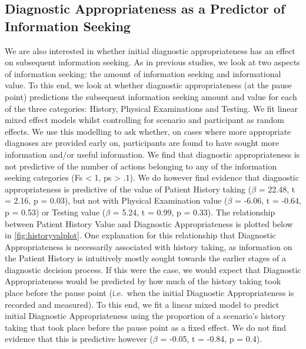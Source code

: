 \documentclass[a4paper, nobind]{templates/ociamthesis}
\begin{document}
\subsection{Diagnostic Appropriateness as a Predictor of Information Seeking}\label{diagnostic-appropriateness-as-a-predictor-of-information-seeking}

\hfill\break
We are also interested in whether initial diagnostic appropriateness has an effect on subsequent information seeking. As in previous studies, we look at two aspects of information seeking: the amount of information seeking and informational value. To this end, we look at whether diagnostic appropriateness (at the pause point) predictions the subsequent information seeking amount and value for each of the three categories: History, Physical Examinations and Testing. We fit linear mixed effect models whilst controlling for scenario and participant as random effects. We use this modelling to ask whether, on cases where more appropriate diagnoses are provided early on, participants are found to have sought more information and/or useful information. We find that diagnostic appropriateness is not predictive of the number of actions belonging to any of the information seeking categories (Fs \textless{} 1, ps \textgreater{} .1). We do however find evidence that diagnostic appropriateness is predictive of the value of Patient History taking (\(\beta\) = 22.48, t = 2.16, p = 0.03), but not with Physical Examination value (\(\beta\) = -6.06, t = -0.64, p = 0.53) or Testing value (\(\beta\) = 5.24, t = 0.99, p = 0.33). The relationship between Patient History Value and Diagnostic Appropriateness is plotted below in \hyperref[fig:historyvalplot]{\ref{fig:historyvalplot}}. One explanation for this relationship that Diagnostic Appropriateness is necessarily associated with history taking, as information on the Patient History is intuitively mostly sought towards the earlier stages of a diagnostic decision process. If this were the case, we would expect that Diagnostic Appropriateness would be predicted by how much of the history taking took place before the pause point (i.e.~when the initial Diagnostic Appropriateness is recorded and measured). To this end, we fit a linear mixed model to predict initial Diagnostic Appropriateness using the proportion of a scenario's history taking that took place before the pause point as a fixed effect. We do not find evidence that this is predictive however (\(\beta\) = -0.05, t = -0.84, p = 0.4).
\end{document}
